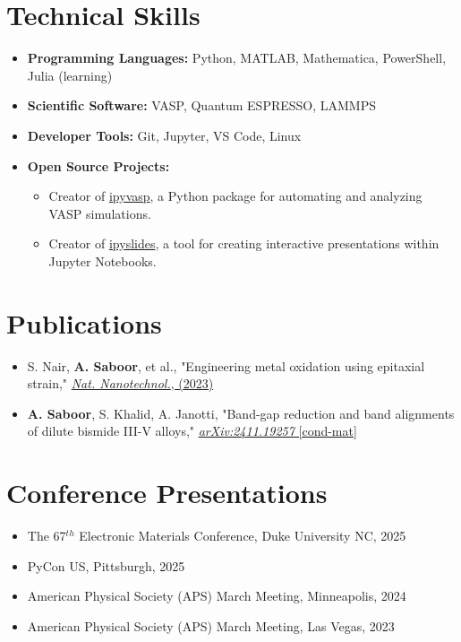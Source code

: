 \documentclass[letter,11pt]{article}
\begin{document}
\section{Technical Skills}
\begin{itemize}
    \item \textbf{Programming Languages:} Python, MATLAB, Mathematica, PowerShell, Julia (learning)
    \item \textbf{Scientific Software:} VASP, Quantum ESPRESSO, LAMMPS
    \item \textbf{Developer Tools:} Git, Jupyter, VS Code, Linux
    \item \textbf{Open Source Projects:}
    \begin{itemize}
        \item Creator of \href{https://github.com/asaboor-gh/ipyvasp}{ipyvasp}, a Python package for automating and analyzing VASP simulations.
        \item Creator of \href{https://github.com/asaboor-gh/ipyslides}{ipyslides}, a tool for creating interactive presentations within Jupyter Notebooks.
    \end{itemize}
\end{itemize}

\section{Publications}
\begin{itemize}
    \item S. Nair, \textbf{A. Saboor}, et al., "Engineering metal oxidation using epitaxial strain," \href{https://www.nature.com/articles/s41565-023-01397-0}{\textit{Nat. Nanotechnol.}, (2023)}
    \item \textbf{A. Saboor}, S. Khalid, A. Janotti, "Band-gap reduction and band alignments of dilute bismide III-V alloys," \href{https://arxiv.org/abs/2411.19257}{\textit{arXiv:2411.19257} [cond-mat]}
\end{itemize}

\section{Conference Presentations}
\begin{itemize}
    \item The 67$^{th}$ Electronic Materials Conference, Duke University NC, 2025
    \item PyCon US, Pittsburgh, 2025
    \item American Physical Society (APS) March Meeting, Minneapolis, 2024
    \item American Physical Society (APS) March Meeting, Las Vegas, 2023
\end{itemize}
\end{document}
